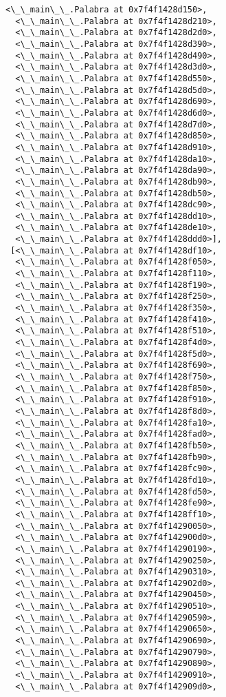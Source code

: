 \documentclass[12pt,a4paper,table]{article}
\begin{document}
\begin{tcolorbox}[breakable, size=fbox, boxrule=.5pt, pad at break*=1mm, opacityfill=0]
\begin{Verbatim}[commandchars=\\\{\}]
  <\_\_main\_\_.Palabra at 0x7f4f1428d150>,
  <\_\_main\_\_.Palabra at 0x7f4f1428d210>,
  <\_\_main\_\_.Palabra at 0x7f4f1428d2d0>,
  <\_\_main\_\_.Palabra at 0x7f4f1428d390>,
  <\_\_main\_\_.Palabra at 0x7f4f1428d490>,
  <\_\_main\_\_.Palabra at 0x7f4f1428d3d0>,
  <\_\_main\_\_.Palabra at 0x7f4f1428d550>,
  <\_\_main\_\_.Palabra at 0x7f4f1428d5d0>,
  <\_\_main\_\_.Palabra at 0x7f4f1428d690>,
  <\_\_main\_\_.Palabra at 0x7f4f1428d6d0>,
  <\_\_main\_\_.Palabra at 0x7f4f1428d7d0>,
  <\_\_main\_\_.Palabra at 0x7f4f1428d850>,
  <\_\_main\_\_.Palabra at 0x7f4f1428d910>,
  <\_\_main\_\_.Palabra at 0x7f4f1428da10>,
  <\_\_main\_\_.Palabra at 0x7f4f1428da90>,
  <\_\_main\_\_.Palabra at 0x7f4f1428db90>,
  <\_\_main\_\_.Palabra at 0x7f4f1428db50>,
  <\_\_main\_\_.Palabra at 0x7f4f1428dc90>,
  <\_\_main\_\_.Palabra at 0x7f4f1428dd10>,
  <\_\_main\_\_.Palabra at 0x7f4f1428de10>,
  <\_\_main\_\_.Palabra at 0x7f4f1428ddd0>],
 [<\_\_main\_\_.Palabra at 0x7f4f1428df10>,
  <\_\_main\_\_.Palabra at 0x7f4f1428f050>,
  <\_\_main\_\_.Palabra at 0x7f4f1428f110>,
  <\_\_main\_\_.Palabra at 0x7f4f1428f190>,
  <\_\_main\_\_.Palabra at 0x7f4f1428f250>,
  <\_\_main\_\_.Palabra at 0x7f4f1428f350>,
  <\_\_main\_\_.Palabra at 0x7f4f1428f410>,
  <\_\_main\_\_.Palabra at 0x7f4f1428f510>,
  <\_\_main\_\_.Palabra at 0x7f4f1428f4d0>,
  <\_\_main\_\_.Palabra at 0x7f4f1428f5d0>,
  <\_\_main\_\_.Palabra at 0x7f4f1428f690>,
  <\_\_main\_\_.Palabra at 0x7f4f1428f750>,
  <\_\_main\_\_.Palabra at 0x7f4f1428f850>,
  <\_\_main\_\_.Palabra at 0x7f4f1428f910>,
  <\_\_main\_\_.Palabra at 0x7f4f1428f8d0>,
  <\_\_main\_\_.Palabra at 0x7f4f1428fa10>,
  <\_\_main\_\_.Palabra at 0x7f4f1428fad0>,
  <\_\_main\_\_.Palabra at 0x7f4f1428fb50>,
  <\_\_main\_\_.Palabra at 0x7f4f1428fb90>,
  <\_\_main\_\_.Palabra at 0x7f4f1428fc90>,
  <\_\_main\_\_.Palabra at 0x7f4f1428fd10>,
  <\_\_main\_\_.Palabra at 0x7f4f1428fd50>,
  <\_\_main\_\_.Palabra at 0x7f4f1428fe90>,
  <\_\_main\_\_.Palabra at 0x7f4f1428ff10>,
  <\_\_main\_\_.Palabra at 0x7f4f14290050>,
  <\_\_main\_\_.Palabra at 0x7f4f142900d0>,
  <\_\_main\_\_.Palabra at 0x7f4f14290190>,
  <\_\_main\_\_.Palabra at 0x7f4f14290250>,
  <\_\_main\_\_.Palabra at 0x7f4f14290310>,
  <\_\_main\_\_.Palabra at 0x7f4f142902d0>,
  <\_\_main\_\_.Palabra at 0x7f4f14290450>,
  <\_\_main\_\_.Palabra at 0x7f4f14290510>,
  <\_\_main\_\_.Palabra at 0x7f4f14290590>,
  <\_\_main\_\_.Palabra at 0x7f4f14290650>,
  <\_\_main\_\_.Palabra at 0x7f4f14290690>,
  <\_\_main\_\_.Palabra at 0x7f4f14290790>,
  <\_\_main\_\_.Palabra at 0x7f4f14290890>,
  <\_\_main\_\_.Palabra at 0x7f4f14290910>,
  <\_\_main\_\_.Palabra at 0x7f4f142909d0>,

\end{Verbatim}
\end{tcolorbox}
\end{document}
